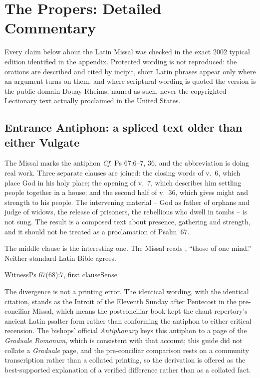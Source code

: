 \section*{The Propers: Detailed Commentary}

Every claim below about the Latin Missal was checked in the exact 2002 typical edition identified in the appendix. Protected wording is not reproduced: the orations are described and cited by incipit, short Latin phrases appear only where an argument turns on them, and where scriptural wording is quoted the version is the public-domain Douay-Rheims, named as such, never the copyrighted Lectionary text actually proclaimed in the United States.

\subsection*{Entrance Antiphon: a spliced text older than either Vulgate}

The Missal marks the antiphon \emph{Cf.} Ps 67:6--7, 36, and the abbreviation is doing real work. Three separate clauses are joined: the closing words of v.~6, which place God in his holy place; the opening of v.~7, which describes him settling people together in a house; and the second half of v.~36, which gives might and strength to his people. The intervening material -- God as father of orphans and judge of widows, the release of prisoners, the rebellious who dwell in tombs -- is not sung. The result is a composed text about presence, gathering and strength, and it should not be treated as a proclamation of Psalm~67.

The middle clause is the interesting one. The Missal reads , ``those of one mind.'' Neither standard Latin Bible agrees.

\begin{threecoltable}{Witness}{Ps 67(68):7, first clause}{Sense}
\end{threecoltable}

The divergence is not a printing error. The identical wording, with the identical citation, stands as the Introit of the Eleventh Sunday after Pentecost in the pre-conciliar Missal, which means the postconciliar book kept the chant repertory's ancient Latin psalter form rather than conforming the antiphon to either critical recension. The bishops' official \emph{Antiphonary} keys this antiphon to a page of the \emph{Graduale Romanum}, which is consistent with that account; this guide did not collate a \emph{Graduale} page, and the pre-conciliar comparison rests on a community transcription rather than a collated printing, so the derivation is offered as the best-supported explanation of a verified difference rather than as a collated fact.

